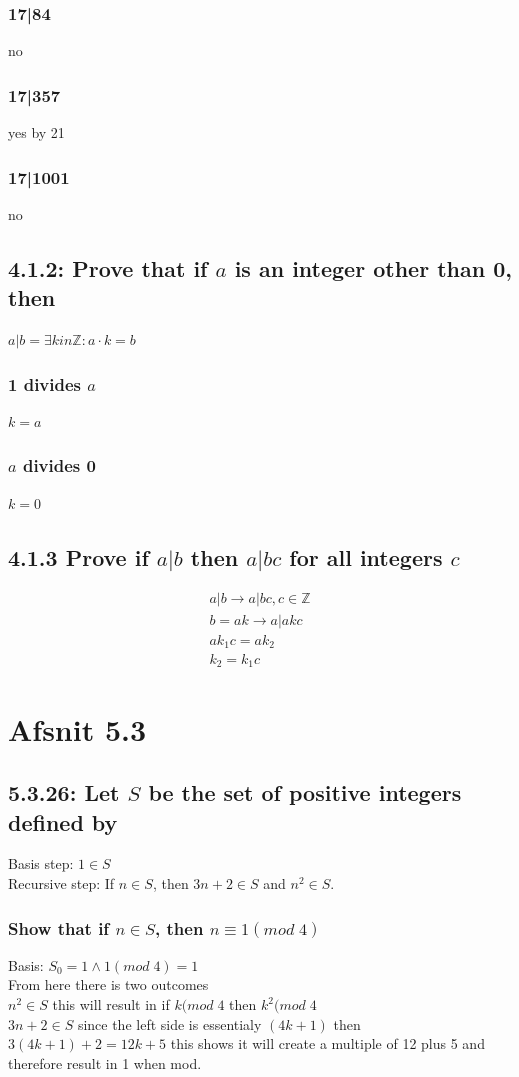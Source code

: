\documentclass[12pt, a4paper]{report}
\begin{document}
					\subsubsection{17|84}
						no
					\subsubsection{17|357}
						yes by 21
					\subsubsection{17|1001}
						no
				\subsection{4.1.2: Prove that if $a$ is an integer other than 0, then}
					$a|b=\exists k in \mathbb{Z}: a\cdot k = b$
					\subsubsection{1 divides $a$}
						$k=a$
					\subsubsection{$a$ divides 0}
						$k=0$
				\subsection{4.1.3 Prove if $a | b$ then $a | bc $ for all integers $c$}
					\begin{align*}
						a|b\rightarrow a|bc, c\in \mathbb{Z}\\
						b=ak\rightarrow a|akc\\
						ak_1c=ak_2\\
						k_2=k_1c
					\end{align*}
			\section{Afsnit 5.3}
				\setcounter{subsection}{25}
				\subsection{5.3.26: Let $S$ be the set of positive integers defined by}
					Basis step: $1\in S$\\
					Recursive step: If $n\in S$, then $3n+2\in S$ and $n^2\in S$.\\
					\subsubsection{Show that if $n\in S$, then $n\equiv 1(mod\; 4)$}
						Basis: $S_0=1 \land 1 (mod\; 4)=1$\\ 
						From here there is two outcomes\\
						$n^2 \in S$ this will result in if $k (mod\; 4$ then $k^2 (mod\;4$\\
						$3n+2\in S$ since the left side is essentialy $(4k+1)$ then $3(4k+1)+2=12k+5$ this shows it will create a multiple of 12 plus 5 and therefore result in 1 when mod.
\end{document}
